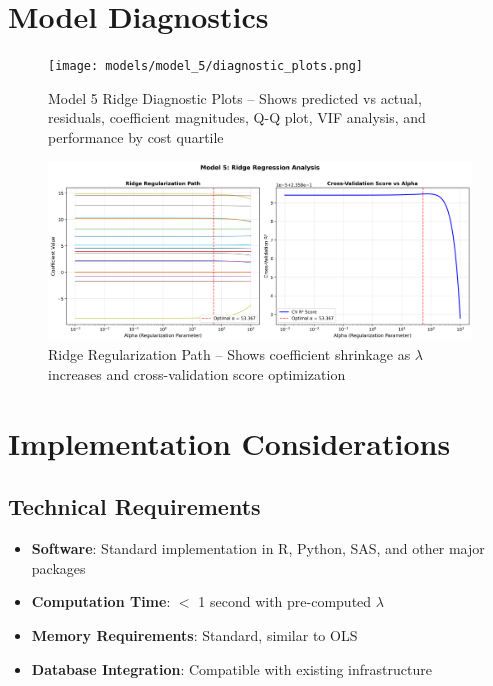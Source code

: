 \section{Model Diagnostics}

\begin{figure}[h]
    \centering
    \texttt{[image: models/model\_5/diagnostic\_plots.png]}
    \caption{Model 5 Ridge Diagnostic Plots -- Shows predicted vs actual, residuals, coefficient magnitudes, Q-Q plot, VIF analysis, and performance by cost quartile}
    \label{fig:model5_diagnostics}
\end{figure}

\begin{figure}[h]
    \centering
    \includegraphics[width=\textwidth]{models/model_5/regularization_path.png}
    \caption{Ridge Regularization Path -- Shows coefficient shrinkage as $\lambda$ increases and cross-validation score optimization}
    \label{fig:model5_regpath}
\end{figure}

\section{Implementation Considerations}

\subsection{Technical Requirements}

\begin{itemize}
    \item \textbf{Software}: Standard implementation in R, Python, SAS, and other major packages
    \item \textbf{Computation Time}: $<$ 1 second with pre-computed $\lambda$
    \item \textbf{Memory Requirements}: Standard, similar to OLS
    \item \textbf{Database Integration}: Compatible with existing infrastructure
\end{itemize}

